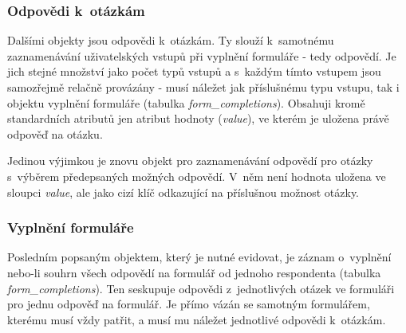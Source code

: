 	\subsubsection{Odpovědi k~otázkám}
	Dalšími objekty jsou odpovědi k~otázkám. Ty slouží k~samotnému zaznamenávání uživatelských vstupů při vyplnění formuláře - tedy odpovědí. Je jich stejné množství jako počet typů vstupů a s~každým tímto vstupem jsou samozřejmě relačně provázány - musí náležet jak příslušnému typu vstupu, tak i objektu vyplnění formuláře (tabulka \textit{form\_completions}). Obsahuji kromě standardních atributů jen atribut hodnoty (\textit{value}), ve kterém je uložena právě odpověď na otázku.
	
	Jedinou výjimkou je znovu objekt pro zaznamenávání odpovědí pro otázky s~výběrem předepsaných možných odpovědí. V~něm není hodnota uložena ve sloupci \textit{value}, ale jako cizí klíč odkazující na příslušnou možnost otázky.
	
	\subsubsection{Vyplnění formuláře}\label{sec:form_completions}
	Posledním popsaným objektem, který je nutné evidovat, je záznam o~vyplnění nebo-li souhrn všech odpovědí na formulář od jednoho respondenta (tabulka \textit{form\_completions}). Ten seskupuje odpovědi z~jednotlivých otázek ve formuláři pro jednu odpověď na formulář. Je přímo vázán se samotným formulářem, kterému musí vždy patřit, a musí mu náležet jednotlivé odpovědi k~otázkám.
	
	
	